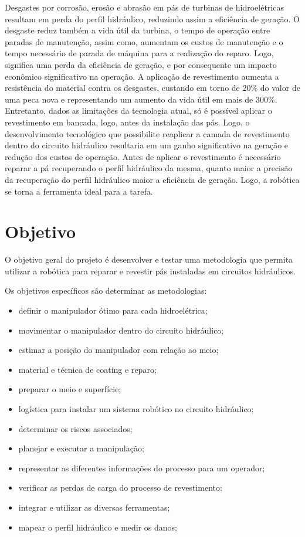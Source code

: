 Desgastes por corrosão, erosão e abrasão em pás de turbinas de hidroelétricas
resultam em perda do perfil hidráulico, reduzindo assim a eficiência de geração.
O desgaste reduz também a vida útil da turbina, o tempo de operação entre
paradas de manutenção, assim como, aumentam os custos de manutenção e o tempo
necessário de parada de máquina para a realização do reparo. Logo, significa uma
perda da eficiência de geração, e por consequente um impacto econômico
significativo na operação.
A aplicação de revestimento aumenta a resistência do material contra os
desgastes, custando em torno de 20\% do valor de uma peca nova e representando
um aumento da vida útil em mais de 300\%. Entretanto, dados as limitações da
tecnologia atual, só é possível aplicar o revestimento em bancada, logo, antes
da instalação das pás. Logo, o desenvolvimento tecnológico que possibilite
reaplicar a camada de revestimento dentro do circuito hidráulico resultaria em
um ganho significativo na geração e redução dos custos de operação.
Antes de aplicar o revestimento é necessário reparar a pá recuperando o perfil
hidráulico da mesma, quanto maior a precisão da recuperação do perfil hidráulico
maior a eficiência de geração. Logo, a robótica se torna a ferramenta ideal para a tarefa.

\section{Objetivo}

O objetivo geral do projeto é desenvolver e testar uma metodologia que permita
utilizar a robótica para reparar e revestir pás instaladas em circuitos hidráulicos.

Os objetivos específicos são determinar as metodologias: 

\begin{itemize}
  \item definir o manipulador ótimo para cada hidroelétrica; 
  \item movimentar o manipulador dentro do circuito hidráulico;
  \item estimar a posição do manipulador com relação ao meio;
  \item material e técnica de coating e reparo; 
  \item preparar o meio e superfície;
  \item logística para instalar um sistema robótico no circuito hidráulico;
  \item determinar os riscos associados;
  \item planejar e executar a manipulação;
  \item representar as diferentes informações do processo para um operador;
  \item verificar as perdas de carga do processo de revestimento;
  \item integrar e utilizar as diversas ferramentas;
  \item mapear o perfil hidráulico e medir os danos;
\end{itemize}

